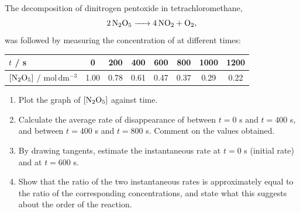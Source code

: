 \documentclass[11pt]{article}
\newcounter{popsec}
\newcounter{popsub}
\newcommand{\courssub}[1]{%
  \stepcounter{popsub}%
  \par\vspace{9pt}\noindent{\popxbold\fontsize{11.5}{13}\selectfont\color{popink}{\color{poporange}\thepopsec.\thepopsub}\hspace{6pt}#1}\par\nopagebreak\vspace{4pt}
}
\begin{document}
\courssub{I practise}

\begin{exercice}
The decomposition of dinitrogen pentoxide in tetrachloromethane,
\[
\ce{2N2O5 -> 4NO2 + O2},
\]
was followed by measuring the concentration of  at different times:
\begin{center}
\begin{tabular}{|l|c|c|c|c|c|c|c|}
\hline
\rowcolor{popblueL} $t$ / s & 0 & 200 & 400 & 600 & 800 & 1000 & 1200 \\
\hline $[\ce{N2O5}]$ / $\mathrm{mol\,dm^{-3}}$ & 1.00 & 0.78 & 0.61 & 0.47 & 0.37 & 0.29 & 0.22 \\
\hline
\end{tabular}
\end{center}
\begin{enumerate}
\item Plot the graph of $[\ce{N2O5}]$ against time.
\item Calculate the average rate of disappearance of  between $t = 0$ s and $t = 400$ s, and between $t = 400$ s and $t = 800$ s. Comment on the values obtained.
\item By drawing tangents, estimate the instantaneous rate at $t = 0$ s (initial rate) and at $t = 600$ s.
\item Show that the ratio of the two instantaneous rates is approximately equal to the ratio of the corresponding concentrations, and state what this suggests about the order of the reaction.
\end{enumerate}
\end{exercice}
\end{document}
